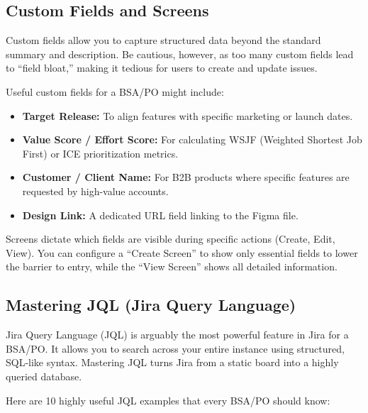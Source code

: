 \subsection{Custom Fields and Screens}\label{custom-fields-and-screens}

Custom fields allow you to capture structured data beyond the standard
summary and description. Be cautious, however, as too many custom fields
lead to ``field bloat,'' making it tedious for users to create and
update issues.

Useful custom fields for a BSA/PO might include:

\begin{itemize}
\tightlist
\item
  \textbf{Target Release:} To align features with specific marketing or
  launch dates.
\item
  \textbf{Value Score / Effort Score:} For calculating WSJF (Weighted
  Shortest Job First) or ICE prioritization metrics.
\item
  \textbf{Customer / Client Name:} For B2B products where specific
  features are requested by high-value accounts.
\item
  \textbf{Design Link:} A dedicated URL field linking to the Figma file.
\end{itemize}

Screens dictate which fields are visible during specific actions
(Create, Edit, View). You can configure a ``Create Screen'' to show only
essential fields to lower the barrier to entry, while the ``View
Screen'' shows all detailed information.

\subsection{Mastering JQL (Jira Query
Language)}\label{mastering-jql-jira-query-language}

Jira Query Language (JQL) is arguably the most powerful feature in Jira
for a BSA/PO. It allows you to search across your entire instance using
structured, SQL-like syntax. Mastering JQL turns Jira from a static
board into a highly queried database.

Here are 10 highly useful JQL examples that every BSA/PO should know:


